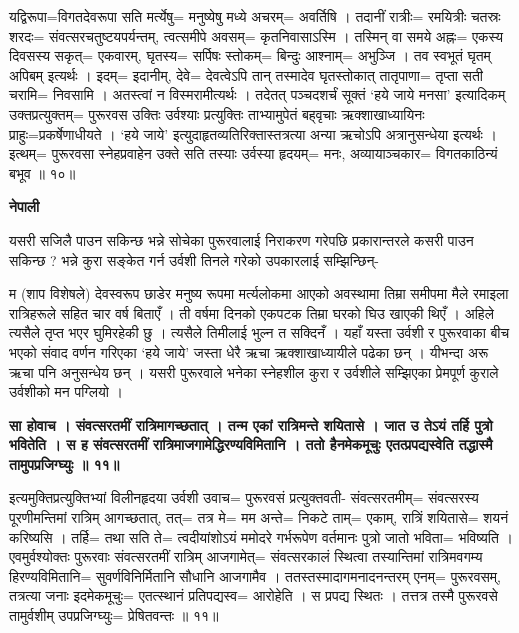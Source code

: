 \documentclass[11pt, a5paper]{article}
\begin{document}
यद्विरूपा=विगतदेवरूपा सति मर्त्येषु= मनुष्येषु मध्ये अचरम्= अवर्तिषि । तदानीं रात्रीः= रमयित्रीः चतस्रः शरदः= संवत्सरचतुष्टयपर्यन्तम्, त्वत्समीपे अवसम्= कृतनिवासाऽस्मि । तस्मिन् वा समये अह्नः= एकस्य दिवसस्य सकृत्= एकवारम्, घृतस्य= सर्पिषः स्तोकम्= बिन्दुः आश्नाम्= अभुञ्जि । तव स्वभूतं घृतम् अपिबम् इत्यर्थः । इदम्= इदानीम्, देवे= देवत्वेऽपि तान् तस्मादेव घृतस्तोकात् तातृपाणा= तृप्ता सती चरामि= निवसामि । अतस्त्वां न विस्मरामीत्यर्थः । तदेतत् पञ्चदशर्चं सूक्तं ‘हये जाये मनसा’ इत्यादिकम् उक्तप्रत्युक्तम्= पुरूरवस उक्तिः उर्वश्याः प्रत्युक्तिः ताभ्यामुपेतं बह्‌वृचाः ऋक्शाखाध्यायिनः प्राहुः=प्रकर्षेणाधीयते । ‘हये जाये’ इत्युदाहृतव्यतिरिक्तास्तत्रत्या अन्या ऋचोऽपि अत्रानुसन्धेया इत्यर्थः । इत्थम्= पुरूरवसा स्नेहप्रवाहेन उक्ते सति तस्याः उर्वस्या हृदयम्= मनः, अव्यायाञ्चकार= विगतकाठिन्यं बभूव ॥ १०॥

\textbf{नेपाली}

यसरी सजिलै पाउन सकिन्छ भन्ने सोचेका पुरूरवालाई निराकरण गरेपछि प्रकारान्तरले कसरी पाउन सकिन्छ ? भन्ने कुरा सङ्केत गर्न उर्वशी तिनले गरेको उपकारलाई सम्झिन्छिन्-

म (शाप विशेषले) देवस्वरूप छाडेर मनुष्य रूपमा मर्त्यलोकमा आएको अवस्थामा तिम्रा समीपमा मैले रमाइला रात्रिहरूले सहित चार वर्ष बिताएँ । ती वर्षमा दिनको एकपटक तिम्रा घरको घिउ खाएकी थिएँ । अहिले त्यसैले तृप्त भएर घुमिरहेकी छु । त्यसैले तिमीलाई भुल्न त सक्दिनँ । यहाँ यस्ता उर्वशी र पुरूरवाका बीच भएको संवाद वर्णन गरिएका  ‘हये जाये’ जस्ता धेरै ऋचा ऋक्शाखाध्यायीले पढेका छन् । यीभन्दा अरू ऋचा पनि अनुसन्धेय छन् । यसरी पुरूरवाले भनेका स्नेहशील कुरा र उर्वशीले सम्झिएका प्रेमपूर्ण कुराले उर्वशीको मन पग्लियो ।

\textbf{सा होवाच । संवत्सरतमीं रात्रिमागच्छतात् । तन्म एकां रात्रिमन्ते शयितासे । जात उ तेऽयं तर्हि पुत्रो भवितेति । स ह संवत्सरतमीं  रात्रिमाजगामेद्धिरण्यविमितानि । ततो हैनमेकमूचुः एतत्प्रपद्यस्वेति तद्धास्मै तामुपप्रजिग्घ्युः ॥ ११॥}

इत्यमुक्तिप्रत्युक्तिभ्यां विलीनहृदया उर्वशी उवाच= पुरूरवसं प्रत्युक्तवती- संवत्सरतमीम्= संवत्सरस्य पूरणीमन्तिमां रात्रिम् आगच्छतात्, तत्= तत्र मे= मम अन्ते= निकटे ताम्= एकाम्, रात्रिं शयितासे= शयनं करिष्यसि । तर्हि= तथा सति ते= त्वदीयांशोऽयं ममोदरे गर्भरूपेण वर्तमानः पुत्रो जातो भविता= भविष्यति । एवमुर्वश्योक्तः पुरूरवाः संवत्सरतमीं रात्रिम् आजगामेत्= संवत्सरकालं स्थित्वा तस्यान्तिमां रात्रिमवगम्य हिरण्यविमितानि= सुवर्णविनिर्मितानि सौधानि आजगामैव । ततस्तस्मादागमनादनन्तरम् एनम्= पुरूरवसम्, तत्रत्या जनाः इदमेकमूचुः= एतत्स्थानं प्रतिपद्यस्व= आरोहेति । स प्रपद्य स्थितः । तत्तत्र तस्मै पुरूरवसे तामुर्वशीम् उपप्रजिग्घ्युः= प्रेषितवन्तः ॥ ११॥
\end{document}
